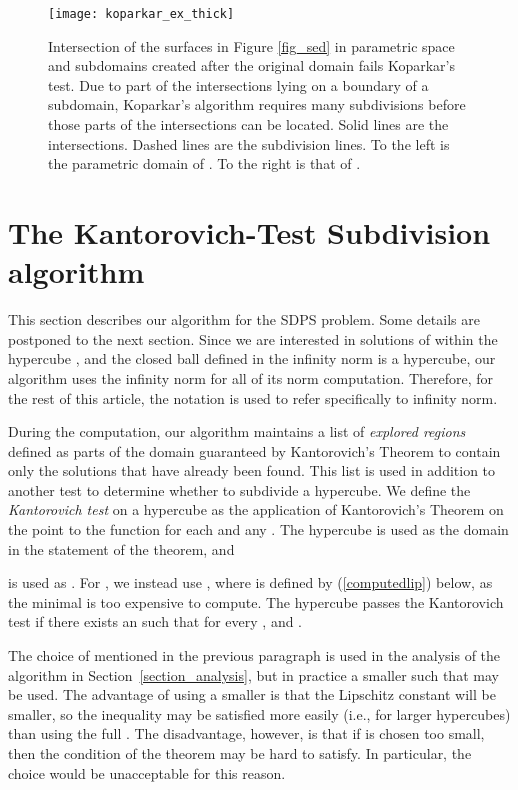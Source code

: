 \documentclass{article}
\begin{document}
\begin{figure}
\centering
\texttt{[image: koparkar\_ex\_thick]}
\caption{Intersection of the surfaces in Figure \ref{fig_sed} in parametric space and subdomains created after the original domain  fails Koparkar's test.  Due to part of the intersections lying on a boundary of a subdomain, Koparkar's algorithm requires many subdivisions before those parts of the intersections can be located.  Solid lines are the intersections.  Dashed lines are the subdivision lines. To the left is the parametric domain of .  To the right is that of .}
\label{fig_koparkar}
\end{figure}


\section{The Kantorovich-Test Subdivision algorithm}
\label{sec:algo}

This section describes our algorithm for the SDPS problem. 
Some details are postponed to the next section.
Since we are interested in solutions of  within the hypercube , and the closed ball  defined in the infinity norm is a hypercube, our algorithm uses the infinity norm for all of its norm computation.  Therefore, for
the rest of this article, the notation  is used to
refer specifically to infinity norm.

During the computation, our algorithm maintains a list of
\emph{explored regions} defined as parts of the domain 
guaranteed by Kantorovich's Theorem to contain only
the solutions that have already been found.  This list is used
in addition to another test to determine whether to subdivide a
hypercube.  We define the \emph{Kantorovich test} on a hypercube
 as the application of Kantorovich's Theorem
on the point  to the function  for each  and any .  The hypercube  is used as the domain
 in the statement of the theorem, and

is used as . For , we instead use , where  is defined by (\ref{computedlip})
below, as the minimal  is too expensive to compute. The
hypercube  passes the Kantorovich test if there exists an  such that for every ,
 and .

The choice of  mentioned in the previous paragraph is used in
the analysis of the algorithm in Section~\ref{section_analysis}, but
in practice a smaller  such that 
may be used.  The advantage of using a smaller  is that the Lipschitz
constant  will be smaller, so the 
inequality 
may be satisfied
more easily (i.e., for larger hypercubes) than using the full .
The disadvantage, however, is that if  is chosen too small,
then
the condition  of the theorem may be hard
to satisfy. In particular, the choice  would be
unacceptable for this reason.
\end{document}
